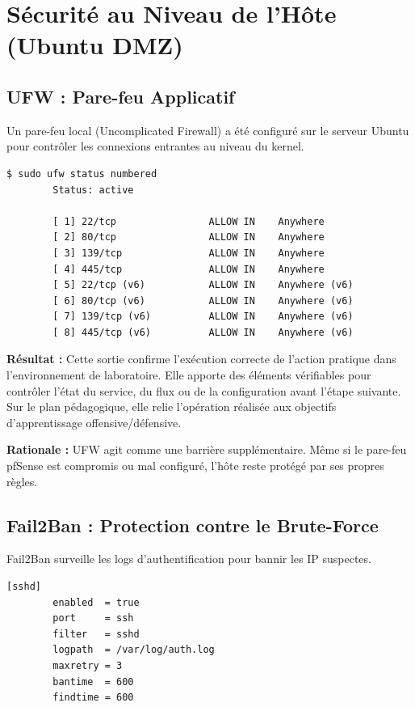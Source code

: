 \documentclass[12pt,a4paper,openany]{report}
\begin{document}
	\section{Sécurité au Niveau de l'Hôte (Ubuntu DMZ)}
	
	
	\subsection{UFW : Pare-feu Applicatif}
	Un pare-feu local (Uncomplicated Firewall) a été configuré sur le serveur Ubuntu pour contrôler les connexions entrantes au niveau du kernel.
	
	\begin{lstlisting}[caption=Configuration UFW sur Ubuntu DMZ]
		$ sudo ufw status numbered
		Status: active
		
		[ 1] 22/tcp                ALLOW IN    Anywhere
		[ 2] 80/tcp                ALLOW IN    Anywhere
		[ 3] 139/tcp               ALLOW IN    Anywhere
		[ 4] 445/tcp               ALLOW IN    Anywhere
		[ 5] 22/tcp (v6)           ALLOW IN    Anywhere (v6)
		[ 6] 80/tcp (v6)           ALLOW IN    Anywhere (v6)
		[ 7] 139/tcp (v6)          ALLOW IN    Anywhere (v6)
		[ 8] 445/tcp (v6)          ALLOW IN    Anywhere (v6)
	\end{lstlisting}
	
	\textbf{Résultat :} Cette sortie confirme l'exécution correcte de l'action pratique dans l'environnement de laboratoire. Elle apporte des éléments vérifiables pour contrôler l'état du service, du flux ou de la configuration avant l'étape suivante. Sur le plan pédagogique, elle relie l'opération réalisée aux objectifs d'apprentissage offensive/défensive.
	
	\textbf{Rationale :} UFW agit comme une barrière supplémentaire. Même si le pare-feu pfSense est compromis ou mal configuré, l'hôte reste protégé par ses propres règles.
	
	\subsection{Fail2Ban : Protection contre le Brute-Force}
	Fail2Ban surveille les logs d'authentification pour bannir les IP suspectes.
	
	\begin{lstlisting}[caption=Configuration Fail2Ban (jail.local)]
		[sshd]
		enabled  = true
		port     = ssh
		filter   = sshd
		logpath  = /var/log/auth.log
		maxretry = 3
		bantime  = 600
		findtime = 600
	\end{lstlisting}
	
\end{document}
